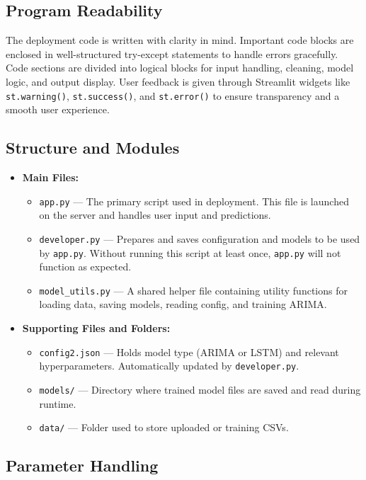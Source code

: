 \subsection{Program Readability}

The deployment code is written with clarity in mind. Important code blocks are enclosed in well-structured try-except statements to handle errors gracefully. Code sections are divided into logical blocks for input handling, cleaning, model logic, and output display. User feedback is given through Streamlit widgets like \texttt{st.warning()}, \texttt{st.success()}, and \texttt{st.error()} to ensure transparency and a smooth user experience.

\subsection{Structure and Modules}

\begin{itemize}
	\item \textbf{Main Files:}
	\begin{itemize}
		\item \texttt{app.py} — The primary script used in deployment. This file is launched on the server and handles user input and predictions.
		\item \texttt{developer.py} — Prepares and saves configuration and models to be used by \texttt{app.py}. Without running this script at least once, \texttt{app.py} will not function as expected.
		\item \texttt{model\_utils.py} — A shared helper file containing utility functions for loading data, saving models, reading config, and training ARIMA.
	\end{itemize}
	\item \textbf{Supporting Files and Folders:}
	\begin{itemize}
		\item \texttt{config2.json} — Holds model type (ARIMA or LSTM) and relevant hyperparameters. Automatically updated by \texttt{developer.py}.
		\item \texttt{models/} — Directory where trained model files are saved and read during runtime.
		\item \texttt{data/} — Folder used to store uploaded or training CSVs.
	\end{itemize}
\end{itemize}

\subsection{Parameter Handling}

